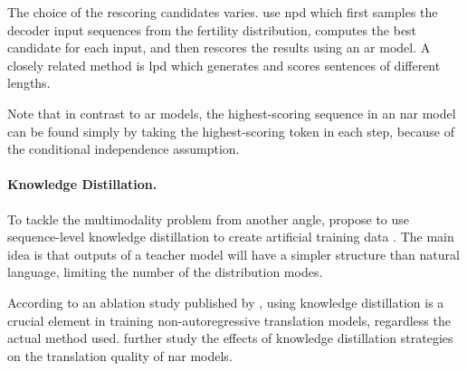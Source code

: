 The choice of the rescoring candidates varies. \citet{gu2017nonautoregressive}
use \ac{npd} which first samples the decoder input sequences from the fertility
distribution, computes the best candidate for each input, and then rescores the
results using an \ac{ar} model. A closely related method is \ac{lpd} which
generates and scores sentences of different lengths.

Note that in contrast to \ac{ar} models, the highest-scoring sequence in an
\acs{nar} model can be found simply by taking the highest-scoring token in each
step, because of the conditional independence assumption.

\paragraph{Knowledge Distillation.} To tackle the multimodality problem from
another angle, \citet{gu2017nonautoregressive} propose to use sequence-level
knowledge distillation to create artificial training data
\citep{kim-rush-2016-sequence}.  The main idea is that outputs of a teacher model will have a simpler
structure than natural language, limiting the number of the distribution modes.

According to an ablation study published by \citet{gu-kong-2021-fully}, using
knowledge distillation is a crucial element in training non-autoregressive
translation models, regardless the actual method used.
\citet{zhou-etal-2020-understanding} further study the effects of knowledge
distillation strategies on the translation quality of \ac{nar} models. 

